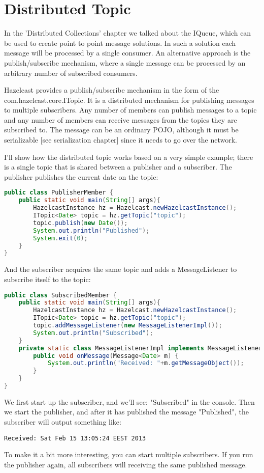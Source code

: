 \chapter{Distributed Topic}
In the 'Distributed Collections' chapter we talked about the IQueue, which can be used to create point to point message solutions. In such a solution each message will be processed by a single consumer. An alternative approach is the publish/subscribe mechanism, where a single message can be processed by an arbitrary number of subscribed consumers.

Hazelcast provides a publish/subscribe mechanism in the form of the com.hazelcast.core.ITopic. It is a distributed mechanism for publishing messages to multiple subscribers. Any number of members can publish messages to a topic and any number of members can receive messages from the topics they are subscribed to. The message can be an ordinary POJO, although it must be serializable [see serialization chapter] since it needs to go over the network.

I'll show how the distributed topic works based on a very simple example; there is a single topic that is shared between a publisher and a subscriber. The publisher publishes the current date on the topic:
\begin{lstlisting}[language=java]
public class PublisherMember {
    public static void main(String[] args){
        HazelcastInstance hz = Hazelcast.newHazelcastInstance();
        ITopic<Date> topic = hz.getTopic("topic");
        topic.publish(new Date());
        System.out.println("Published");
        System.exit(0);
    }
}
\end{lstlisting}
And the subscriber acquires the same topic and adds a MessageListener to subscribe itself to the topic:
\begin{lstlisting}[language=java]
public class SubscribedMember {
    public static void main(String[] args){
        HazelcastInstance hz = Hazelcast.newHazelcastInstance();
        ITopic<Date> topic = hz.getTopic("topic");
        topic.addMessageListener(new MessageListenerImpl());
        System.out.println("Subscribed");
    }
    private static class MessageListenerImpl implements MessageListener<Date> {
        public void onMessage(Message<Date> m) {
            System.out.println("Received: "+m.getMessageObject());
        }
    }
}
\end{lstlisting}
We first start up the subscriber, and we'll see: "Subscribed" in the console. Then we start the publisher, and after it has published the message "Published", the subscriber will output something like:
\begin{lstlisting}
Received: Sat Feb 15 13:05:24 EEST 2013
\end{lstlisting}
To make it a bit more interesting, you can start multiple subscribers. If you run the publisher again, all subscribers will receiving the same published message.

